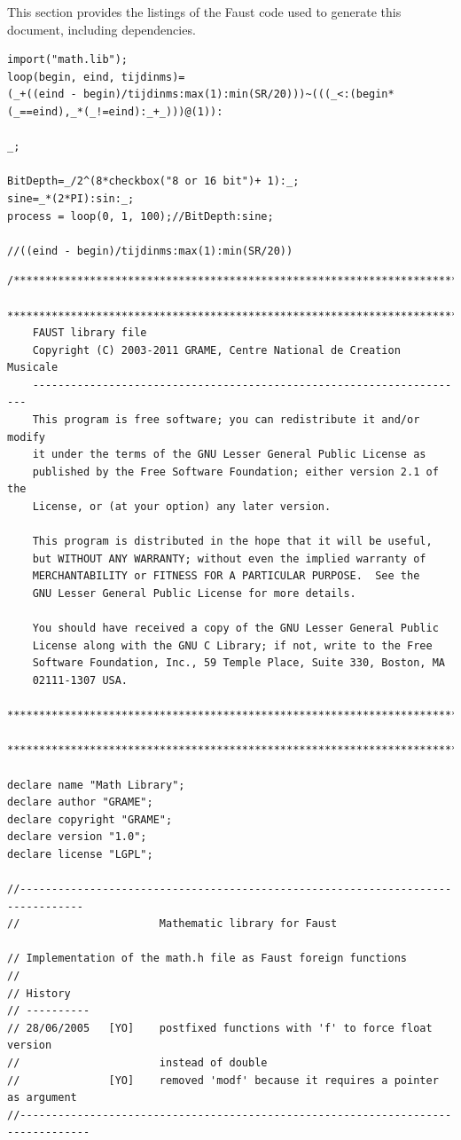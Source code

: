 \documentclass{article}
\begin{document}
This section provides the listings of the Faust code used to generate this document, including dependencies.

\bigskip\bigskip
\begin{lstlisting}[caption=\texttt{Sinewaveoscillator.dsp}]
import("math.lib");
loop(begin, eind, tijdinms)=
(_+((eind - begin)/tijdinms:max(1):min(SR/20)))~(((_<:(begin*(_==eind),_*(_!=eind):_+_)))@(1)):

_;

BitDepth=_/2^(8*checkbox("8 or 16 bit")+ 1):_;
sine=_*(2*PI):sin:_;
process = loop(0, 1, 100);//BitDepth:sine;

//((eind - begin)/tijdinms:max(1):min(SR/20))
\end{lstlisting}


\bigskip\bigskip
\begin{lstlisting}[caption=\texttt{math.lib}]
/************************************************************************
 ************************************************************************
  	FAUST library file
	Copyright (C) 2003-2011 GRAME, Centre National de Creation Musicale
    ---------------------------------------------------------------------
    This program is free software; you can redistribute it and/or modify
    it under the terms of the GNU Lesser General Public License as 
	published by the Free Software Foundation; either version 2.1 of the 
	License, or (at your option) any later version.

    This program is distributed in the hope that it will be useful,
    but WITHOUT ANY WARRANTY; without even the implied warranty of
    MERCHANTABILITY or FITNESS FOR A PARTICULAR PURPOSE.  See the
    GNU Lesser General Public License for more details.

    You should have received a copy of the GNU Lesser General Public
 	License along with the GNU C Library; if not, write to the Free
  	Software Foundation, Inc., 59 Temple Place, Suite 330, Boston, MA
  	02111-1307 USA. 
 ************************************************************************
 ************************************************************************/

declare name "Math Library";
declare author "GRAME";
declare copyright "GRAME";
declare version "1.0";
declare license "LGPL"; 

//--------------------------------------------------------------------------------
// 						Mathematic library for Faust

// Implementation of the math.h file as Faust foreign functions
//
// History
// ----------
// 28/06/2005	[YO]	postfixed functions with 'f' to force float version
//						instead of double
//			  	[YO]	removed 'modf' because it requires a pointer as argument
//---------------------------------------------------------------------------------


\end{lstlisting}
\end{document}
